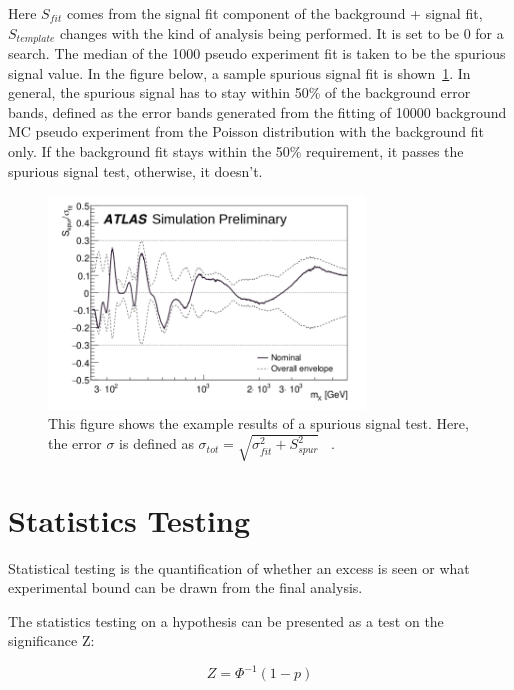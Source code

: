     Here $S_{fit}$ comes from the signal fit component of the background + signal fit, $S_{template}$ changes with the kind of analysis being performed. It is set to be 0 for a search. 
    The median of the 1000 pseudo experiment fit is taken to be the spurious signal value. 
    In the figure below, a sample spurious signal fit is shown~\ref{spurioussignal}.
    In general, the spurious signal has to stay within 50\% of the background error bands, defined as the error bands generated from the fitting of 10000 background MC pseudo experiment from the Poisson distribution with the background fit only.
    If the background fit stays within the 50\% requirement, it passes the spurious signal test, otherwise, it doesn't. 


\begin{figure}[!htb]
    \begin{center}
        \includegraphics[width=0.75\textwidth]{figures/chapter_analysismethod/Spurious}
        \caption{
            This figure shows the example results of a spurious signal test. Here, the error $\sigma$ is defined as $\sigma_{tot} = \sqrt{\sigma^{2}_{fit}+ S_{spur}^{2}}$ ~\cite{ATL-PHYS-PUB-2020-028}.
        }
        \label{spurioussignal}
    \end{center}
\end{figure}


\section{Statistics Testing}
Statistical testing is the quantification of whether an excess is seen or what experimental bound can be drawn from the final analysis. 

The statistics testing on a hypothesis can be presented as a test on the significance Z: 

\begin{equation}
 Z= \Phi^{-1}(1-p) 
 \label{eq:significance}
\end{equation}

